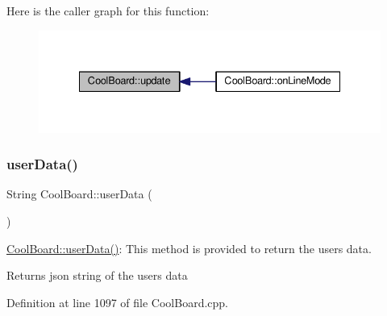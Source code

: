 Here is the caller graph for this function\+:\nopagebreak
\begin{figure}[H]
\begin{center}
\leavevmode
\includegraphics[width=335pt]{d7/df9/class_cool_board_a8612756d3f73198cdde857a66f0fe690_icgraph}
\end{center}
\end{figure}
\mbox{\label{class_cool_board_ae7358fb6e623cfc81b775f5f1734909b}} 
\subsubsection{\texorpdfstring{user\+Data()}{userData()}}
{\footnotesize\ttfamily String Cool\+Board\+::user\+Data (\begin{DoxyParamCaption}{ }\end{DoxyParamCaption})}

\hyperlink{class_cool_board_ae7358fb6e623cfc81b775f5f1734909b}{Cool\+Board\+::user\+Data()}\+: This method is provided to return the user\textquotesingle{}s data.

\begin{DoxyReturn}{Returns}
json string of the user\textquotesingle{}s data 
\end{DoxyReturn}


Definition at line 1097 of file Cool\+Board.\+cpp.


